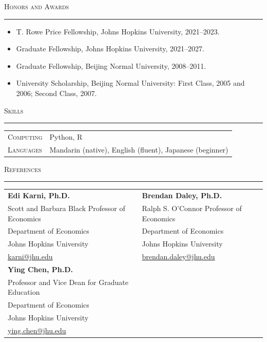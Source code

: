 \documentclass[11pt]{article}
\newcommand{\cvsection}[1]{%
  \vspace{1.1em}
  {\large\scshape #1}\par
  \vspace{0.56em}
  \hrule
  \vspace{0.62em}
}
\begin{document}
\cvsection{Honors and Awards}
\begin{itemize}[label={}]
  \item T. Rowe Price Fellowship, Johns Hopkins University, 2021--2023.
  \item Graduate Fellowship, Johns Hopkins University, 2021--2027.
  \item Graduate Fellowship, Beijing Normal University, 2008--2011.
  \item University Scholarship, Beijing Normal University: First Class, 2005 and 2006; Second Class, 2007.
\end{itemize}

\cvsection{Skills}
\begin{tabular}{@{}p{}p{}@{}}
\textsc{Computing} & Python, R \\
\textsc{Languages} & Mandarin (native), English (fluent), Japanese (beginner)
\end{tabular}

\cvsection{References}
\begin{tabular}{@{}p{}@{\hspace{0.06\textwidth}}p{}@{}}
\textbf{Edi Karni, Ph.D.} &
\textbf{Brendan Daley, Ph.D.} \\
Scott and Barbara Black Professor of Economics &
Ralph S. O'Connor Professor of Economics \\
Department of Economics &
Department of Economics \\
Johns Hopkins University &
Johns Hopkins University \\
\href{mailto:karni@jhu.edu}{karni@jhu.edu} &
\href{mailto:brendan.daley@jhu.edu}{brendan.daley@jhu.edu} \\[1.1em]

\textbf{Ying Chen, Ph.D.} & \\
Professor and Vice Dean for Graduate Education & \\
Department of Economics & \\
Johns Hopkins University & \\
\href{mailto:ying.chen@jhu.edu}{ying.chen@jhu.edu} &
\end{tabular}
\end{document}

